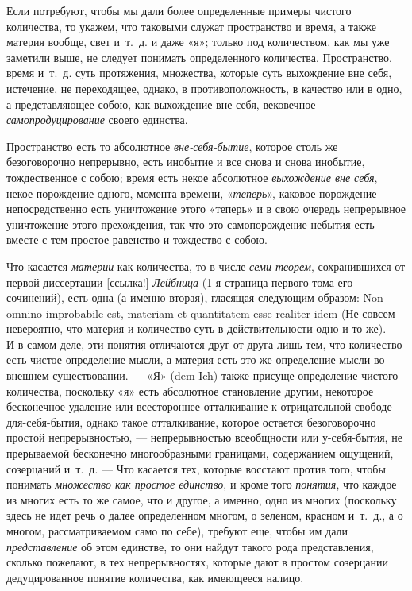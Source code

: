 Если потребуют, чтобы мы дали более определенные примеры чистого количества,
то укажем, что таковыми служат пространство и время, а также материя
вообще, свет и~т.~д. и даже «я»; только под количеством, как мы уже
заметили выше, не следует понимать определенного количества. Пространство,
время и~т.~д. суть протяжения, множества, которые суть выхождение вне себя,
истечение, не переходящее, однако, в противоположность, в качество или в
одно, а представляющее собою, как выхождение вне себя, вековечное
{\em самопродуцирование} своего единства.

Пространство есть то абсолютное {\em вне-себя-бытие},
которое столь же безоговорочно непрерывно, есть инобытие и все снова и
снова инобытие, тождественное с собою; время есть некое абсолютное
{\em выхождение вне себя}, некое порождение одного,
момента времени, «{\em теперь}», каковое порождение
непосредственно есть уничтожение этого «теперь» и в свою очередь
непрерывное уничтожение этого прехождения, так что это самопорождение
небытия есть вместе с тем простое равенство и тождество с собою.

Что касается {\em материи} как количества, то в числе
{\em семи теорем}, сохранившихся от первой
диссертации [ссылка!] {\em Лейбница} (1-я страница первого тома его
сочинений), есть одна (а именно вторая), гласящая следующим образом: Non
omnino improbabile est, materiam et quantitatem esse realiter idem
(Не совсем невероятно, что материя и количество суть в действительности
одно и то же). — И в самом деле, эти понятия отличаются друг от друга лишь
тем, что количество есть чистое определение мысли, а материя есть это же
определение мысли во внешнем существовании. — «Я» (dem Ich) также присуще
определение чистого количества, поскольку «я» есть абсолютное становление
другим, некоторое бесконечное удаление или всестороннее отталкивание к
отрицательной свободе для-себя-бытия, однако такое отталкивание, которое
остается безоговорочно простой непрерывностью, — непрерывностью всеобщности
или у-себя-бытия, не прерываемой бесконечно многообразными границами,
содержанием ощущений, созерцаний и~т.~д. — Что касается тех, которые
восстают против того, чтобы понимать {\em множество как
простое единство}, и кроме того {\em понятия}, что
каждое из многих есть то же самое, что и другое, а именно, одно из многих
(поскольку здесь не идет речь о далее определенном многом, о зеленом,
красном и~т.~д., а о многом, рассматриваемом само по себе), требуют еще,
чтобы им дали {\em представление} об этом единстве, то
они найдут такого рода представления, сколько пожелают, в тех
непрерывностях, которые дают в простом созерцании дедуцированное понятие
количества, как имеющееся налицо.

